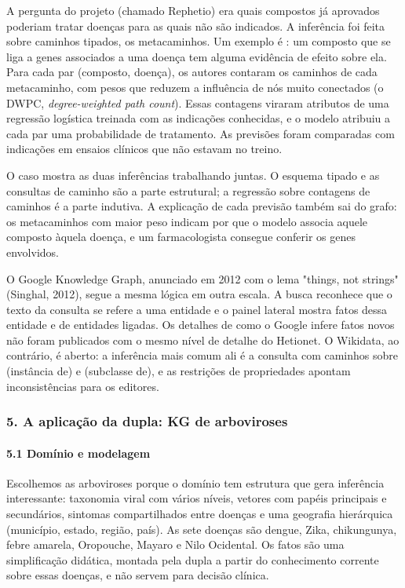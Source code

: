 \documentclass[12pt, a4paper]{article}
\DeclareRobustCommand{\texttt}[1]{\breakabletexttt{#1}}
\begin{document}
A pergunta do projeto (chamado Rephetio) era quais compostos já aprovados poderiam tratar doenças para as quais não são indicados. A inferência foi feita sobre caminhos tipados, os metacaminhos. Um exemplo é \texttt{Compound–binds–Gene–associates–Disease}: um composto que se liga a genes associados a uma doença tem alguma evidência de efeito sobre ela. Para cada par (composto, doença), os autores contaram os caminhos de cada metacaminho, com pesos que reduzem a influência de nós muito conectados (o DWPC, \emph{degree-weighted path count}). Essas contagens viraram atributos de uma regressão logística treinada com as indicações conhecidas, e o modelo atribuiu a cada par uma probabilidade de tratamento. As previsões foram comparadas com indicações em ensaios clínicos que não estavam no treino.

O caso mostra as duas inferências trabalhando juntas. O esquema tipado e as consultas de caminho são a parte estrutural; a regressão sobre contagens de caminhos é a parte indutiva. A explicação de cada previsão também sai do grafo: os metacaminhos com maior peso indicam por que o modelo associa aquele composto àquela doença, e um farmacologista consegue conferir os genes envolvidos.

O Google Knowledge Graph, anunciado em 2012 com o lema "things, not strings" (Singhal, 2012), segue a mesma lógica em outra escala. A busca reconhece que o texto da consulta se refere a uma entidade e o painel lateral mostra fatos dessa entidade e de entidades ligadas. Os detalhes de como o Google infere fatos novos não foram publicados com o mesmo nível de detalhe do Hetionet. O Wikidata, ao contrário, é aberto: a inferência mais comum ali é a consulta com caminhos sobre \texttt{P31} (instância de) e \texttt{P279} (subclasse de), e as restrições de propriedades apontam inconsistências para os editores.

\subsubsection{5. A aplicação da dupla: KG de arboviroses}\label{5-a-aplicauxe7uxe3o-da-dupla-kg-de-arboviroses}

\paragraph{5.1 Domínio e modelagem}\label{51-domuxednio-e-modelagem}

Escolhemos as arboviroses porque o domínio tem estrutura que gera inferência interessante: taxonomia viral com vários níveis, vetores com papéis principais e secundários, sintomas compartilhados entre doenças e uma geografia hierárquica (município, estado, região, país). As sete doenças são dengue, Zika, chikungunya, febre amarela, Oropouche, Mayaro e Nilo Ocidental. Os fatos são uma simplificação didática, montada pela dupla a partir do conhecimento corrente sobre essas doenças, e não servem para decisão clínica.
\end{document}
